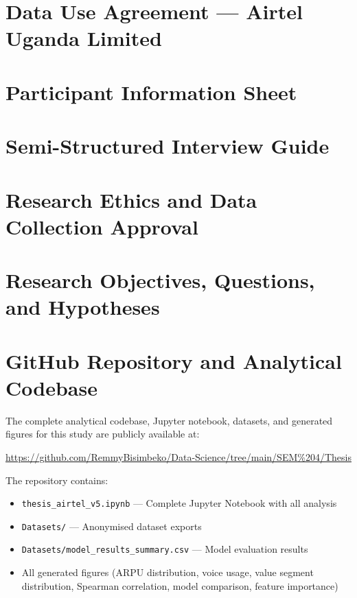 \chapter{Data Use Agreement --- Airtel Uganda Limited}
\label{App:DUA}


\chapter{Participant Information Sheet}
\label{App:participant-info}


\chapter{Semi-Structured Interview Guide}
\label{App:interview-guide}


\chapter{Research Ethics and Data Collection Approval}
\label{App:ethics}


\chapter{Research Objectives, Questions, and Hypotheses}
\label{App:objectives}


\chapter{GitHub Repository and Analytical Codebase}
\label{App:github}
The complete analytical codebase, Jupyter notebook, datasets, and generated figures for this study are publicly available at:

\begin{center}
\url{https://github.com/RemmyBisimbeko/Data-Science/tree/main/SEM%204/Thesis}
\end{center}

The repository contains:
\begin{itemize}
    \item \texttt{thesis\_airtel\_v5.ipynb} --- Complete Jupyter Notebook with all analysis
    \item \texttt{Datasets/} --- Anonymised dataset exports
    \item \texttt{Datasets/model\_results\_summary.csv} --- Model evaluation results
    \item All generated figures (ARPU distribution, voice usage, value segment distribution, Spearman correlation, model comparison, feature importance)
\end{itemize}

